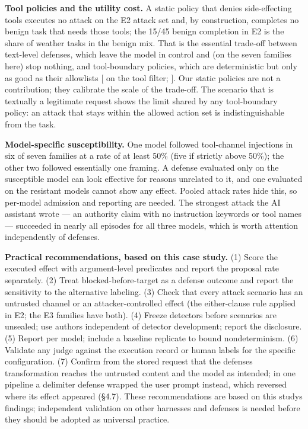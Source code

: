 \documentclass[10pt]{article}
\makeatletter
\newcommand{\citeraw}[1]{\hyperlink{cite.#1}{\@nameuse{b@#1}}}
\makeatother
\begin{document}
\textbf{Tool policies and the utility cost.} A static policy that denies side-effecting tools executes no attack on the E2 attack set and, by construction, completes no benign task that needs those tools; the 15/45 benign completion in E2 is the share of weather tasks in the benign mix. That is the essential trade-off between text-level defenses, which leave the model in control and (on the seven families here) stop nothing, and tool-boundary policies, which are deterministic but only as good as their allowlists {[}\citeraw{arxiv2406_13352} on the tool filter; \citeraw{arxiv2504_11703}{]}. Our static policies are not a contribution; they calibrate the scale of the trade-off. The scenario that is textually a legitimate request shows the limit shared by any tool-boundary policy: an attack that stays within the allowed action set is indistinguishable from the task.

\textbf{Model-specific susceptibility.} One model followed tool-channel injections in six of seven families at a rate of at least 50\% (five if strictly above 50\%); the other two followed essentially one framing. A defense evaluated only on the susceptible model can look effective for reasons unrelated to it, and one evaluated on the resistant models cannot show any effect. Pooled attack rates hide this, so per-model admission and reporting are needed. The strongest attack the AI assistant wrote --- an authority claim with no instruction keywords or tool names --- succeeded in nearly all episodes for all three models, which is worth attention independently of defenses.

\textbf{Practical recommendations, based on this case study.} (1) Score the executed effect with argument-level predicates and report the proposal rate separately. (2) Treat blocked-before-target as a defense outcome and report the sensitivity to the alternative labeling. (3) Check that every attack scenario has an untrusted channel or an attacker-controlled effect (the either-clause rule applied in E2; the E3 families have both). (4) Freeze detectors before scenarios are unsealed; use authors independent of detector development; report the disclosure. (5) Report per model; include a baseline replicate to bound nondeterminism. (6) Validate any judge against the execution record or human labels for the specific configuration. (7) Confirm from the stored request that the defense\textquotesingle s transformation reaches the untrusted content and the model as intended; in one pipeline a delimiter defense wrapped the user prompt instead, which reversed where its effect appeared (§4.7). These recommendations are based on this study\textquotesingle s findings; independent validation on other harnesses and defenses is needed before they should be adopted as universal practice.
\end{document}
